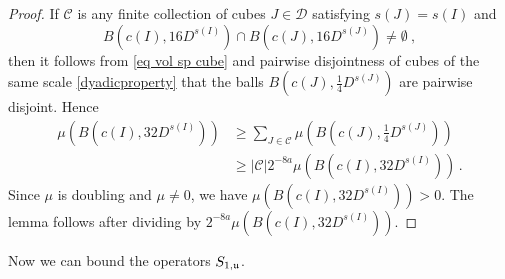 {\begin{proof}
    If $\mathcal{C}$ is any finite collection of cubes $J \in \mathcal{D}$ satisfying $s(J) = s(I)$ and
    \begin{equation*}
        B(c(I), 16 D^{s(I)}) \cap B(c(J), 16 D^{s(J)}) \ne\emptyset\ ,
    \end{equation*} then it follows from \eqref{eq vol sp cube} and pairwise disjointness of cubes of the same scale \eqref{dyadicproperty} that the balls $B(c(J), \frac{1}{4} D^{s(J)})$ are pairwise disjoint. Hence
    \begin{align*}
        \mu(B(c(I), 32 D^{s(I)})) &\ge \sum_{J \in \mathcal{C}} \mu(B(c(J), \frac{1}{4}D^{s(J)}))\\
        &\ge |\mathcal{C}| 2^{-8a} \mu(B(c(I), 32 D^{s(I)}))\,.
    \end{align*}
    Since $\mu$ is doubling and $\mu \ne 0$, we have $\mu(B(c(I), 32D^{s(I)})) > 0$. The lemma follows after dividing by $2^{-8a}\mu(B(c(I), 32D^{s(I)}))$.
\end{proof}

Now we can bound the operators $S_{1, \mathfrak u}$.

}
